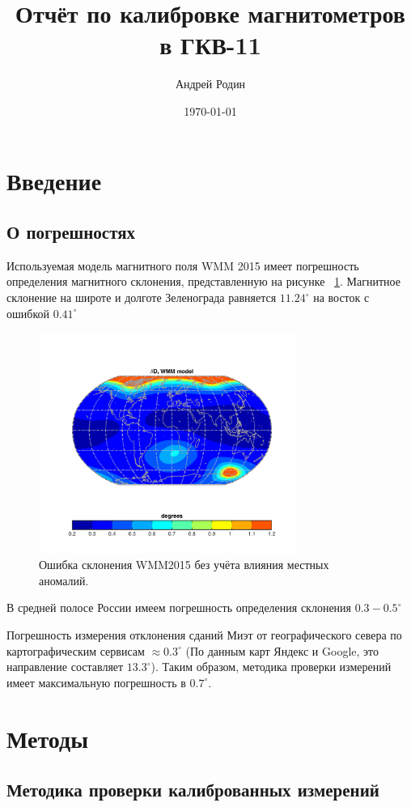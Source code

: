 \documentclass[a4paper,12pt]{article}
\author{Андрей Родин} %
\title{Отчёт по калибровке магнитометров в ГКВ-11}  %
\date{\today} %
\begin{document}
\maketitle

\section{Введение}
\subsection{О погрешностях}
Используемая модель магнитного поля WMM 2015 имеет погрешность определения магнитного склонения, представленную на рисунке ~\ref{fig:WMM_error_field}. Магнитное склонение на широте и долготе Зеленограда равняется $11.24^\circ$ на восток с ошибкой $0.41^\circ$

\begin{figure}[htb] %
\centering
\includegraphics[width=0.75\textwidth]{PICS/WMM2015_Error_Declination.png} %
\caption{\label{fig:WMM_error_field} Ошибка склонения WMM2015 без учёта влияния местных аномалий.} %
\end{figure}

В средней полосе России имеем погрешность определения склонения  $0.3-0.5^\circ$
\vspace{\baselineskip}

Погрешность измерения отклонения сданий Миэт от географического севера по картографическим сервисам  $\approx 0.3^\circ$ (По данным карт Яндекс и Google, это направление составляет $13.3^\circ$). Таким образом, методика проверки измерений имеет максимальную погрешность в $0.7^\circ$. 


\section{Методы}
\subsection{Методика проверки калиброванных измерений}
\end{document}

